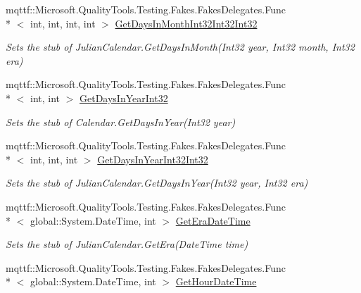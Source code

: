 \begin{DoxyCompactItemize}
mqttf\-::\-Microsoft.\-Quality\-Tools.\-Testing.\-Fakes.\-Fakes\-Delegates.\-Func\\*
$<$ int, int, int, int $>$ \hyperlink{class_system_1_1_globalization_1_1_fakes_1_1_stub_julian_calendar_af06e404844ae76eb9e7dc1613c82c0f8}{Get\-Days\-In\-Month\-Int32\-Int32\-Int32}
\begin{DoxyCompactList}\small\item\em Sets the stub of Julian\-Calendar.\-Get\-Days\-In\-Month(\-Int32 year, Int32 month, Int32 era)\end{DoxyCompactList}\item 
mqttf\-::\-Microsoft.\-Quality\-Tools.\-Testing.\-Fakes.\-Fakes\-Delegates.\-Func\\*
$<$ int, int $>$ \hyperlink{class_system_1_1_globalization_1_1_fakes_1_1_stub_julian_calendar_ad3e6e4082e6f67e989d4aabb5bae9431}{Get\-Days\-In\-Year\-Int32}
\begin{DoxyCompactList}\small\item\em Sets the stub of Calendar.\-Get\-Days\-In\-Year(\-Int32 year)\end{DoxyCompactList}\item 
mqttf\-::\-Microsoft.\-Quality\-Tools.\-Testing.\-Fakes.\-Fakes\-Delegates.\-Func\\*
$<$ int, int, int $>$ \hyperlink{class_system_1_1_globalization_1_1_fakes_1_1_stub_julian_calendar_a57641f4b0ff10d5d1d4d1d275146a182}{Get\-Days\-In\-Year\-Int32\-Int32}
\begin{DoxyCompactList}\small\item\em Sets the stub of Julian\-Calendar.\-Get\-Days\-In\-Year(\-Int32 year, Int32 era)\end{DoxyCompactList}\item 
mqttf\-::\-Microsoft.\-Quality\-Tools.\-Testing.\-Fakes.\-Fakes\-Delegates.\-Func\\*
$<$ global\-::\-System.\-Date\-Time, int $>$ \hyperlink{class_system_1_1_globalization_1_1_fakes_1_1_stub_julian_calendar_a092de93fff2373fc5f4b21151b8a7ff3}{Get\-Era\-Date\-Time}
\begin{DoxyCompactList}\small\item\em Sets the stub of Julian\-Calendar.\-Get\-Era(\-Date\-Time time)\end{DoxyCompactList}\item 
mqttf\-::\-Microsoft.\-Quality\-Tools.\-Testing.\-Fakes.\-Fakes\-Delegates.\-Func\\*
$<$ global\-::\-System.\-Date\-Time, int $>$ \hyperlink{class_system_1_1_globalization_1_1_fakes_1_1_stub_julian_calendar_afd719e5918db83f7c6e7767ee9299413}{Get\-Hour\-Date\-Time}

\end{DoxyCompactItemize}
